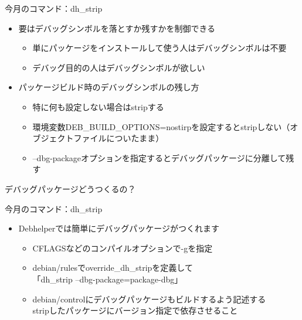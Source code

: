 \begin{frame}{今月のコマンド：dh\_strip}
 \begin{itemize}
  \item 要はデバッグシンボルを落とすか残すかを制御できる
  \begin{itemize}  
   \item 単にパッケージをインストールして使う人はデバッグシンボルは不要
   \item デバッグ目的の人はデバッグシンボルが欲しい
  \end{itemize}
  \item パッケージビルド時のデバッグシンボルの残し方
  \begin{itemize}
   \item 特に何も設定しない場合はstripする
   \item 環境変数DEB\_BUILD\_OPTIONS=nostirpを設定するとstripしない（オブジェクトファイルについたまま）
   \item --dbg-packageオプションを指定するとデバッグパッケージに分離して残す
  \end{itemize}
 \end{itemize}
\end{frame}

\begin{frame}
\begin{center}
\LARGE{デバッグパッケージどうつくるの？}
\end{center}
\end{frame}

\begin{frame}{今月のコマンド：dh\_strip}
 \begin{itemize}
  \item Debhelperでは簡単にデバッグパッケージがつくれます
  \begin{itemize}  
   \item CFLAGSなどのコンパイルオプションで-gを指定
   \item debian/rulesでoverride\_dh\_stripを定義して \\「dh\_strip --dbg-package=package-dbg」
   \item debian/controlにデバッグパッケージもビルドするよう記述する \\ stripしたパッケージにバージョン指定で依存させること
  \end{itemize}
 \end{itemize}
\end{frame}



